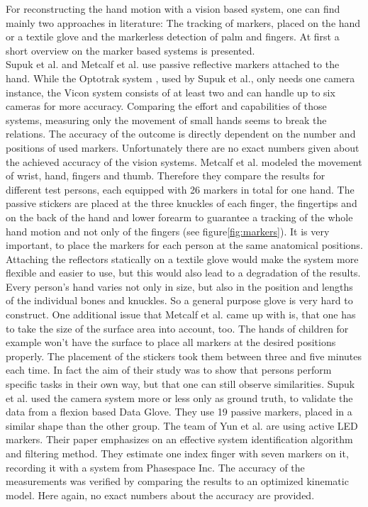 For reconstructing the hand motion with a vision based system, one can find mainly two approaches in literature: The tracking of markers, placed on the hand or a textile glove and the markerless detection of palm and fingers. At first a short overview on the marker based systems is presented. \\
Supuk et al. \cite{supuk2008evaluation} and Metcalf et al. \cite{metcalf2008validation} use passive reflective markers attached to the hand. While the Optotrak system \cite{optotrak}, used by Supuk et al., only needs one camera instance, the Vicon system \cite{vicon} consists of at least two and can handle up to six cameras for more accuracy. Comparing the effort and capabilities of those systems, measuring only the movement of small hands seems to break the relations. The accuracy of the outcome is directly dependent on the number and positions of used markers. Unfortunately there are no exact numbers given about the achieved accuracy of the vision systems. Metcalf et al. modeled the movement of wrist, hand, fingers and thumb. Therefore they compare the results for different test persons, each equipped with 26 markers in total for one hand. The passive stickers are placed at the three knuckles of each finger, the fingertips and on the back of the hand and lower forearm to guarantee a tracking of the whole hand motion and not only of the fingers (see figure\ref{fig:markers}). It is very important, to place the markers for each person at the same anatomical positions. Attaching the reflectors statically on a textile glove would make the system more flexible and easier to use, but this would also lead to a degradation of the results. Every person's hand varies not only in size, but also in the position and lengths of the individual bones and knuckles. So a general purpose glove is very hard to construct. One additional issue that Metcalf et al. came up with is, that one has to take the size of the surface area into account, too. The hands of children for example won't have the surface to place all markers at the desired positions properly. The placement of the stickers took them between three and five minutes each time. In fact the aim of their study was to show that persons perform specific tasks in their own way, but that one can still observe similarities. Supuk et al. used the camera system more or less only as ground truth, to validate the data from a flexion based Data Glove. They use 19 passive markers, placed in a similar shape than the other group. The team of Yun et al. are using active LED markers. Their paper emphasizes on an effective system identification algorithm and filtering method. They estimate one index finger with seven markers on it, recording it with a system from Phasespace Inc. The accuracy of the measurements was verified by comparing the results to an optimized kinematic model. Here again, no exact numbers about the accuracy are provided.\\
